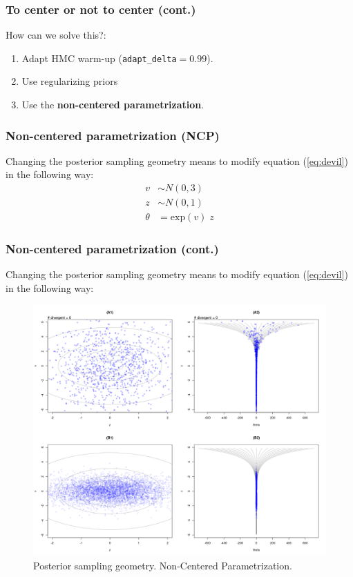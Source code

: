 \documentclass[arial,12pt,xcolor=dvipsnames]{beamer}
\begin{document}
%
\begin{frame}
	\frametitle{To center or not to center (cont.)}
	How can we solve this?:
	\begin{enumerate}
		\item Adapt HMC warm-up (\texttt{adapt\_delta}$=0.99$).
		\item Use regularizing priors
		\item Use the \textbf{non-centered parametrization}.
	\end{enumerate}
\end{frame}
%
\begin{frame}
	\frametitle{Non-centered parametrization (NCP)}
	Changing the posterior sampling geometry means to modify equation (\ref{eq:devil}) in the following way:
	\begin{equation} \label{eq:devil_NC}
		\begin{split}	
			v &\sim N(0, 3) \\
			z &\sim N(0, 1) \\
			\theta &= \text{exp}(v) \; z
		\end{split}
	\end{equation}
\end{frame}
%
\begin{frame}
	\frametitle{Non-centered parametrization (cont.)}
	Changing the posterior sampling geometry means to modify equation (\ref{eq:devil}) in the following way:
	\begin{figure}[h]
		\centering
		\includegraphics[width=0.55\linewidth]{3_funnel_NC}
		\caption{Posterior sampling geometry. Non-Centered Parametrization.}
		\label{fig:devil_NC_geom}
	\end{figure}
\end{frame}
%
%
\end{document}
